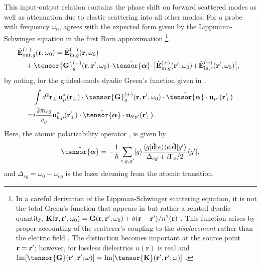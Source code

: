 \documentclass[aps,pra,twocolumn]{revtex4-1} %
\newcommand{\inp}{{\rm in}}
\newcommand{\out}{{\rm out}}
\newcommand{\poltens}{\hat{\tensor{\boldsymbol{\alpha}}}}
\begin{document}
This input-output relation contains the phase shift on forward scattered modes as well as attenuation due to elastic scattering into all other modes. For a probe with frequency $\omega_0$,  agrees with the expected form given by the Lippmann-Schwinger equation in the first Born approximation \footnote{In a careful derivation of the Lippman-Schwinger scattering equation, it is not the total Green's function that appears in  but rather a related dyadic quantity, $\mathbf{K}(\mathbf{r},\mathbf{r}', \omega_0) = \mathbf{G}(\mathbf{r},\mathbf{r}', \omega_0) + \delta(\mathbf{r}-\mathbf{r}')/n^2(\mathbf{r})$ \cite{wubs_multiple-scattering_2004}. 
This function arises by proper accounting of the scatterer's coupling to the \emph{displacement} rather than the electric field \cite{yao_ultrahigh_2009}.  The distinction becomes important at the source point $\mathbf{r} = \mathbf{r}'$; however, for lossless dielectrics $n(\mathbf{r})$ is real and ${\rm Im}[\tensor{\mathbf{G}}(\br',\br'; \omega)] = {\rm Im}[\tensor{\mathbf{K}}(\br',\br'; \omega)]$ \cite{yao_-chip_2010}. },
	\begin{align} \label{Eq::IOScatteredField}
		\!\!\!\hat{\mathbf{E}}^{(+)}_{\out,g}&(\br, \omega_0)=\hat{\mathbf{E}}^{(+)}_{ \inp, g}(\br, \omega_0)\nn\\
		&\!\!\!\!\!\!\!\!\!+\tensor{\mathbf{G}}_g^{(+)}(\br,\br',\omega_0)\!\cdot\! \poltens \!\cdot\! \big[\hat{\mathbf{E}}^{(+)}_{\inp, g}(\br', \omega_0)\!+\!\hat{\mathbf{E}}^{(+)}_{\inp,r}(\br', \omega_0) \big],
	\end{align}
by noting, for the guided-mode dyadic Green's function given in ,
	\begin{align}
		&\int d^2 \mbf{r}_\perp \, \mathbf{u}^*_{\mu} (\br_\perp)\cdot \tensor{\mathbf{G}}_g^{(+)}(\br,\br',\omega_0)\cdot \poltens \cdot \mathbf{u}_{\mu'} (\br'_\perp) \nn\\
		=& i \frac{ 2\pi \omega_0}{v_g} \mathbf{u}^*_{b,p} (\br'_\perp) \cdot \poltens \cdot \mathbf{u}_{b'\!\!, p'} (\br'_\perp). 
	\end{align}
Here, the atomic polarizability operator \cite{buhmann_casimir-polder_2004, deutsch_quantum_2010,kien_dynamical_2013}, is given by
	\begin{equation} \label{Eq::PolarizabilityOperator}
		\poltens = - \frac{1}{\hbar} \sum_{e,g,g'}\ket{g}\frac{\bra{g}\hat{\mathbf{d}}\ket{e}\bra{e} 
\hat{\mathbf{d}}\ket{g'}}{\Delta_{eg} + i \Gamma_{e}/2 }\bra{g'},
	\end{equation}	
and $\Delta_{eg} = \omega_0 - \omega_{eg}$ is the laser detuning from the atomic transition.	
\end{document}
